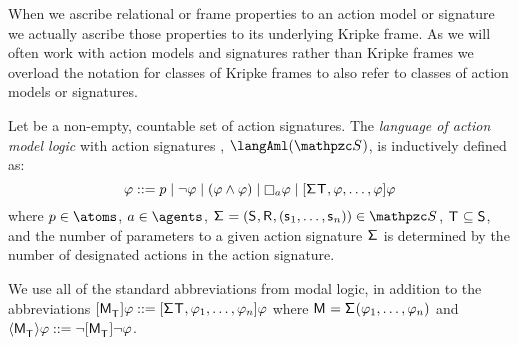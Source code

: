 When we ascribe relational or frame properties to an action model or signature we actually ascribe those properties to its underlying Kripke frame.
As we will often work with action models and signatures rather than Kripke frames we overload the notation for classes of Kripke frames to also refer to classes of action models or signatures.

\begin{definition}
Let \aSignatureFamily{} be a non-empty, countable set of action signatures.
The {\em language of action model logic} with action signatures \aSignatureFamily{}, $\langAml(\aSignatureFamily)$, is inductively defined as:
$$
\phi ::=
    \atomP \mid
    \lnot \phi \mid
    (\phi \land \phi) \mid
    \necessaryA \phi \mid
    \actionA{\aSignature \aStatesT, \phi, \dots, \phi} \phi\\
$$
where $\atomP \in \atoms$, $\agentA \in \agents$, $\aSignatureAndTuple \in \aSignatureFamily$, $\aStatesT \subseteq \aStates$, and the number of parameters to a given action signature $\aSignature$ is determined by the number of designated actions in the action signature.
\end{definition}

We use all of the standard abbreviations from modal logic, in addition to the abbreviations 
$\actionA{\aPModel{\aStatesT}} \phi ::= \actionA{\aSignature \aStatesT, \phi_1, \dots, \phi_n} \phi$ where $\aModel = \aSignature(\phi_1, \dots, \phi_n)$ and 
$\actionE{\aPModel{\aStatesT}} \phi ::= \lnot \actionA{\aPModel{\aStatesT}} \lnot \phi$.

